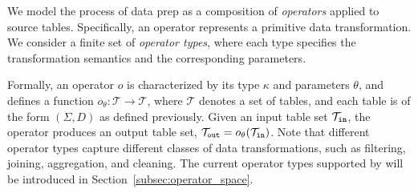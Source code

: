 %

We model the process of data prep as a composition of \emph{operators} applied to source tables.
Specifically, an operator represents a primitive data transformation. We consider a finite set of \emph{operator types}, where each type specifies the transformation semantics and the corresponding parameters. 

Formally, an operator $o$ is characterized by its type $\kappa$ and parameters $\theta$, and defines a function $o_{\theta}: \mathcal{T} \rightarrow \mathcal{T}$, where $\mathcal{T}$ denotes a set of tables, and each table is of the form $(\Sigma, D)$ as defined previously. Given an input table set $\mathcal{T}_{\tt in}$, the operator produces an output table set, \ie $\mathcal{T}_{\tt out}=o_{\theta}(\mathcal{T}_{\tt in})$.
Note that different operator types capture different classes of data transformations, such as filtering, joining, aggregation, and cleaning. The current operator types supported by \sys will be introduced in Section~\ref{subsec:operator_space}.

